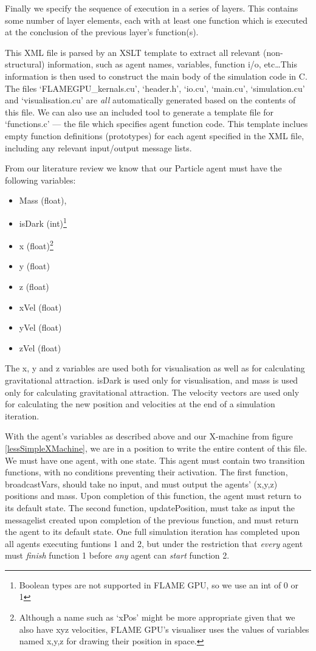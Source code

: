 \documentclass[11pt,a4paper]{article}
\begin{document}
Finally we specify the sequence of execution in a series of layers. This contains some number of layer elements, each with at least one function which is executed at the conclusion of the previous layer's function(s).

This XML file is parsed by an XSLT template to extract all relevant (non-structural) information, such as agent names, variables, function i/o, etc\ldots This information is then used to construct the main body of the simulation code in C. The files `FLAMEGPU\_kernals.cu', `header.h', `io.cu', `main.cu', `simulation.cu' and `visualisation.cu' are \emph{all} automatically generated based on the contents of this file. We can also use an included tool to generate a template file for `functions.c' --- the file which specifies agent function code. This template inclues empty function definitions (prototypes) for each agent specified in the XML file, including any relevant input/output message lists.

From our literature review we know that our Particle agent must have the following variables: 
\begin{itemize} 
\item Mass (float), 
\item isDark (int)\footnote{Boolean types are not supported in FLAME GPU, so we use an int of 0 or 1}
\item x (float)\footnote{Although a name such as `xPos' might be more appropriate given that we also have xyz velocities, FLAME GPU's visualiser uses the values of variables named x,y,z for drawing their position in space.}
\item y (float)
\item z (float)
\item xVel (float)
\item yVel (float)
\item zVel (float)
\end{itemize}

The x, y and z variables are used both for visualisation as well as for calculating gravitational attraction. isDark is used only for visualisation, and mass is used only for calculating gravitational attraction. The velocity vectors are used only for calculating the new position and velocities at the end of a simulation iteration.

With the agent's variables as described above and our X-machine from figure \ref{lessSimpleXMachine}, we are in a position to write the entire content of this file. We must have one agent, with one state. This agent must contain two transition functions, with no conditions preventing their activation. The first function, broadcastVars, should take no input, and must output the agents' (x,y,z) positions and mass. Upon completion of this function, the agent must return to its default state. The second function, updatePosition, must take as input the messagelist created upon completion of the previous function, and must return the agent to its default state. One full simulation iteration has completed upon all agents executing funtions 1 and 2, but under the restriction that \emph{every} agent must \emph{finish} function 1 before \emph{any} agent can \emph{start} function 2.
\end{document}

